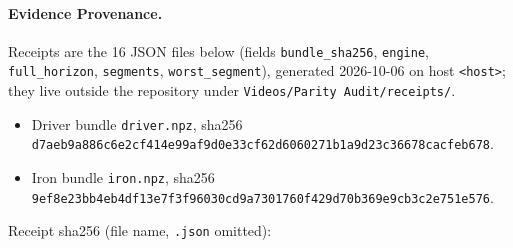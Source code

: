 \documentclass[11pt,a4paper]{article}
\begin{document}
\paragraph{Evidence Provenance.}  Receipts are the 16 JSON files below
(fields \texttt{bundle\_sha256}, \texttt{engine}, \texttt{full\_horizon},
\texttt{segments}, \texttt{worst\_segment}), generated 2026-10-06 on host
\texttt{<host>}; they live outside the repository under
\texttt{Videos/Parity Audit/receipts/}.
\begin{itemize}[nosep]
\item Driver bundle \texttt{driver.npz}, sha256\\
  \texttt{\footnotesize d7aeb9a886c6e2cf414e99af9d0e33cf62d6060271b1a9d23c36678cacfeb678}.
\item Iron bundle \texttt{iron.npz}, sha256\\
  \texttt{\footnotesize 9ef8e23bb4eb4df13e7f3f96030cd9a7301760f429d70b369e9cb3c2e751e576}.
\end{itemize}
Receipt sha256 (file name, \texttt{.json} omitted):
\end{document}
